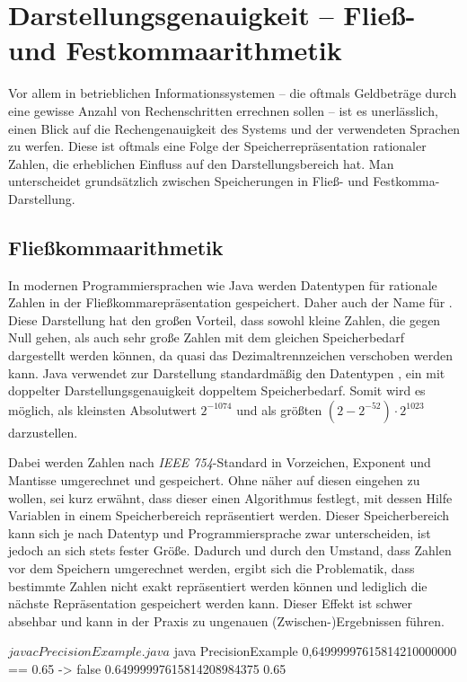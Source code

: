 \section{Darstellungsgenauigkeit -- Fließ- und Festkommaarithmetik}
Vor allem in betrieblichen Informationssystemen -- die oftmals Geldbeträge durch eine gewisse Anzahl von Rechenschritten errechnen sollen -- ist es unerlässlich, einen Blick auf die Rechengenauigkeit des Systems und der verwendeten Sprachen zu werfen. Diese ist oftmals eine Folge der Speicherrepräsentation rationaler Zahlen, die erheblichen Einfluss auf den Darstellungsbereich hat. Man unterscheidet grundsätzlich zwischen Speicherungen in Fließ- und Festkomma-Darstellung.
 
\subsection*{Fließkommaarithmetik}
In modernen Programmiersprachen wie Java werden Datentypen für rationale Zahlen in der Fließkommarepräsentation gespeichert. Daher auch der Name  für \engl {}. Diese Darstellung hat den großen Vorteil, dass sowohl kleine Zahlen, die gegen Null gehen, als auch sehr große Zahlen mit dem gleichen Speicherbedarf dargestellt werden können, da quasi das Dezimaltrennzeichen verschoben werden kann. Java verwendet zur Darstellung standardmäßig den Datentypen , ein  mit doppelter Darstellungsgenauigkeit \bzw doppeltem Speicherbedarf. Somit wird es möglich, als kleinsten Absolutwert $2^{-1074}$ und als größten $(2 - 2^{-52}) \cdot 2^{1023}$ darzustellen.

Dabei werden Zahlen nach \textit{IEEE 754}-Standard in Vorzeichen, Exponent und Mantisse umgerechnet und gespeichert. Ohne näher auf diesen eingehen zu wollen, sei kurz erwähnt, dass dieser einen Algorithmus festlegt, mit dessen Hilfe Variablen in einem Speicherbereich repräsentiert werden. Dieser Speicherbereich kann sich je nach Datentyp und Programmiersprache zwar unterscheiden, ist jedoch an sich stets fester Größe. Dadurch und durch den Umstand, dass Zahlen vor dem Speichern umgerechnet werden, ergibt sich die Problematik, dass bestimmte Zahlen nicht exakt repräsentiert werden können und lediglich die nächste Repräsentation gespeichert werden kann. Dieser Effekt ist schwer absehbar und kann in der Praxis zu ungenauen (Zwischen-)Ergebnissen führen.

\sepCodeAndOutputCheck
\begin{shellwindow}
$ javac PrecisionExample.java 
$ java PrecisionExample
0,64999997615814210000000 == 0.65 -> false
0.64999997615814208984375
0.65
\end{shellwindow}

